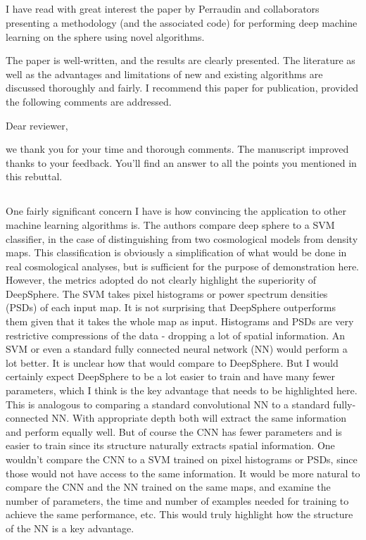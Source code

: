 \documentclass[12pt,a4paper]{article}
\newcommand{\1}{\b{1}}              %
\newcommand{\0}{\b{0}}              %
\begin{document}
\subsection{}

\begin{mdframed}[style=comment]
I have read with great interest the paper by Perraudin and collaborators presenting a methodology (and the associated code) for performing deep machine learning on the sphere using novel algorithms.

The paper is well-written, and the results are clearly presented. The literature as well as the advantages and limitations of new and existing algorithms are discussed thoroughly and fairly. I recommend this paper for publication, provided the following comments are addressed.
\end{mdframed}

Dear reviewer,

we thank you for your time and thorough comments.
The manuscript improved thanks to your feedback.
You'll find an answer to all the points you mentioned in this rebuttal.

\subsection{}
\begin{mdframed}[style=comment]
One fairly significant concern I have is how convincing the application to other machine learning algorithms is. The authors compare deep sphere to a SVM classifier, in the case of distinguishing from two cosmological models from density maps. This classification is obviously a simplification of what would be done in real cosmological analyses, but is sufficient for the purpose of demonstration here. However, the metrics adopted do not clearly highlight the superiority of DeepSphere. The SVM takes pixel histograms or power spectrum densities (PSDs) of each input map. It is not surprising that DeepSphere outperforms them given that it takes the whole map as input. Histograms and PSDs are very restrictive compressions of the data - dropping a lot of spatial information. An SVM or even a standard fully connected neural network (NN) would perform a lot better. It is unclear how that would compare to DeepSphere. But I would certainly expect DeepSphere to be a lot easier to train and have many fewer parameters, which I think is the key advantage that needs to be highlighted here. This is analogous to comparing a standard convolutional NN to a standard fully-connected NN. With appropriate depth both will extract the same information and perform equally well. But of course the CNN has fewer parameters and is easier to train since its structure naturally extracts spatial information. One wouldn't compare the CNN to a SVM trained on pixel histograms or PSDs, since those would not have access to the same information. It would be more natural to compare the CNN and the NN trained on the same maps, and examine the number of parameters, the time and number of examples needed for training to achieve the same performance, etc. This would truly highlight how the structure of the NN is a key advantage.
\end{mdframed}
\end{document}
